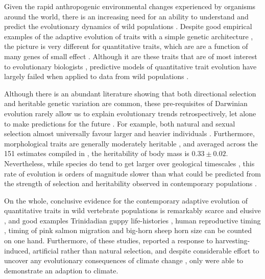 Given the rapid anthropogenic environmental changes experienced by organisms around the world, there is an increasing need for an ability to understand and predict the evolutionary dynamics of wild populations \parencite{parmesan2006,Merila2014}. Despite good empirical examples of the adaptive evolution of traits with a simple genetic architecture \parencite{vantHof2011,Karell2011,Lamichhaney2016}, the picture is very different for quantitative traits, which are are a function of many genes of small effect \parencite{Wellenreuther2016}. Although it are these traits that are of most interest to evolutionary biologists \parencite{Roff2007, Walsh2014}, predictive models of quantitative trait evolution have largely failed when applied to data from wild populations \parencite{Merila2001}. 

Although there is an abundant literature showing that both directional selection \parencite{Kingsolver2001, Kingsolver2012} and heritable genetic variation \parencite{Mousseau1987,Postma2014} are common, these pre-requisites of Darwinian evolution rarely allow us to explain evolutionary trends retrospectively, let alone to make predictions for the future \parencite{Merila2001, Morrissey2012sts}. For example, both natural and sexual selection almost universally favour larger and heavier individuals \parencite{Blanckenhorn2000}. Furthermore, morphological traits are generally moderately heritable \parencite{Mousseau1987, Postma2014}, and averaged across the 151 estimates compiled in \parencite{Postma2014}, the heritability of body mass is  $0.33\pm0.02$. Nevertheless, while species do tend to get larger over geological timescales \parencite{Cope1887,Alroy1998,Heim2014,Baker2015}, this rate of evolution is orders of magnitude slower than what could be predicted from the strength of selection and heritability observed in contemporary populations \parencite{Merila2001, Bell2010a, Gotanda2015}.

On the whole, conclusive evidence for the contemporary adaptive evolution of quantitative traits in wild vertebrate populations is remarkably scarce and elusive \parencite{Merila2001,Morrissey2012sts}, and good examples \textemdash Trinidadian guppy life-histories \parencite{Reznick1996}, human reproductive timing \parencite{Milot2011}, timing of pink salmon migration \parencite{Kovach2012} and big-horn sheep horn size \parencite{Pigeon2016}\textemdash can be counted on one hand. Furthermore, of these studies, \parencite{Pigeon2016} reported a response to harvesting-induced, artificial rather than natural selection, and despite considerable effort to uncover any evolutionary consequences of climate change \parencite{Charmantier2014climate,Gienapp2014,Merila2014,Crozier2014}, only \parencite{Kovach2012} were able to demonstrate an adaption to climate. 

